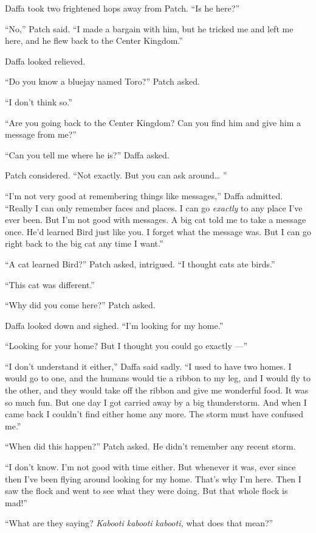 \documentclass[ebook,oneside,openany,17pt]{memoir}
\begin{document}
Daffa took two frightened hops away from Patch. “Is he here?”

“No,” Patch said. “I made a bargain with him, but he tricked me and
left me here, and he flew back to the Center Kingdom.”

Daffa looked relieved.

“Do you know a bluejay named Toro?” Patch asked.

“I don’t think so.”

“Are you going back to the Center Kingdom? Can you find him and give
him a message from me?”

“Can you tell me where he is?” Daffa asked.

Patch considered. “Not exactly. But you can ask around… ”

“I’m not very good at remembering things like messages,” Daffa
admitted. “Really I can only remember faces and places. I can go
\emph{exactly} to any place I’ve ever been. But I’m not good with
messages. A big cat told me to take a message once. He’d learned Bird
just like you. I forget what the message was. But I can go right back
to the big cat any time I want.”

“A cat learned Bird?” Patch asked, intrigued. “I thought cats ate
birds.”

“This cat was different.”

“Why did you come here?” Patch asked.

Daffa looked down and sighed. “I’m looking for my home.”

“Looking for your home? But I thought you could go exactly —”

“I don’t understand it either,” Daffa said sadly. “I used to have two
homes. I would go to one, and the humans would tie a ribbon to my leg,
and I would fly to the other, and they would take off the ribbon and
give me wonderful food. It was so much fun. But one day I got carried
away by a big thunderstorm. And when I came back I couldn’t find
either home any more. The storm must have confused me.”

“When did this happen?” Patch asked. He didn’t remember any recent
storm.

“I don’t know. I’m not good with time either. But whenever it was,
ever since then I’ve been flying around looking for my home. That’s
why I’m here. Then I saw the flock and went to see what they were
doing. But that whole flock is mad!”

“What are they saying? \emph{Kabooti kabooti kabooti,} what does
that mean?”
\end{document}
